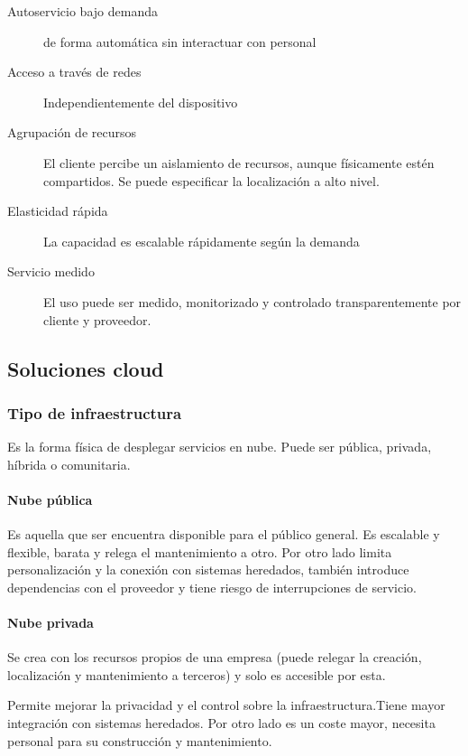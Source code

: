     \begin{description}
        \item[Autoservicio bajo demanda] de forma automática sin interactuar con personal
        \item[Acceso a través de redes] Independientemente del dispositivo
        \item[Agrupación de recursos] El cliente percibe un aislamiento de recursos, aunque físicamente estén compartidos. Se puede especificar la localización a alto nivel.
        \item[Elasticidad rápida] La capacidad es escalable rápidamente según la demanda
        \item[Servicio medido] El uso puede ser medido, monitorizado y controlado transparentemente por cliente y proveedor.
    \end{description}

\subsection{Soluciones cloud}

    \subsubsection{Tipo de infraestructura}
    Es la forma física de desplegar servicios en nube. Puede ser pública, privada, híbrida o comunitaria.

    \paragraph{Nube pública}
        Es aquella que ser encuentra disponible para el público general. Es escalable y flexible, barata y relega el mantenimiento a otro. Por otro lado limita personalización y la conexión con sistemas heredados, también introduce dependencias con el proveedor y tiene riesgo de interrupciones de servicio.

    \paragraph{Nube privada}
        Se crea con los recursos propios de una empresa (puede relegar la creación, localización y mantenimiento a terceros) y solo es accesible por esta. 

        Permite mejorar la privacidad y el control sobre la infraestructura.Tiene mayor integración con sistemas heredados. Por otro lado es un coste mayor, necesita personal para su construcción y mantenimiento.

